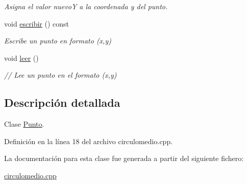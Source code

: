 \begin{DoxyCompactItemize}
\begin{DoxyCompactList}\small\item\em Asigna el valor nuevoY a la coordenada y del punto. \end{DoxyCompactList}\item 
void \hyperlink{classPunto_afc543b48134f632fa354d8b027954e80}{escribir} () const \hypertarget{classPunto_afc543b48134f632fa354d8b027954e80}{}\label{classPunto_afc543b48134f632fa354d8b027954e80}

\begin{DoxyCompactList}\small\item\em Escribe un punto en formato (x,y) \end{DoxyCompactList}\item 
void \hyperlink{classPunto_a84cc9b0ee2e5b00842e7bff819b80459}{leer} ()\hypertarget{classPunto_a84cc9b0ee2e5b00842e7bff819b80459}{}\label{classPunto_a84cc9b0ee2e5b00842e7bff819b80459}

\begin{DoxyCompactList}\small\item\em // Lee un punto en el formato (x,y) \end{DoxyCompactList}\end{DoxyCompactItemize}


\subsection{Descripción detallada}
Clase \hyperlink{classPunto}{Punto}. 

Definición en la línea 18 del archivo circulomedio.\+cpp.



La documentación para esta clase fue generada a partir del siguiente fichero\+:\begin{DoxyCompactItemize}
\item 
\hyperlink{circulomedio_8cpp}{circulomedio.\+cpp}\end{DoxyCompactItemize}
